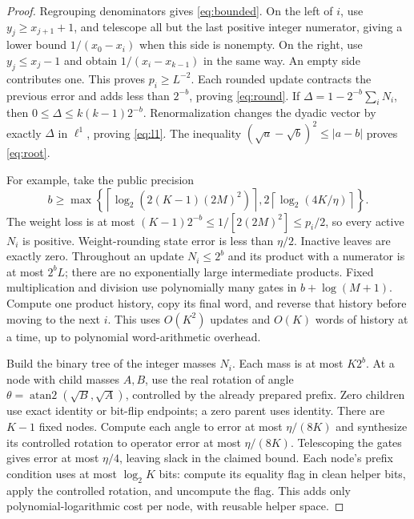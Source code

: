 \documentclass[11pt]{article}
\theoremstyle{definition}
\begin{document}
\begin{proof}
Regrouping denominators gives \eqref{eq:bounded}. On the left of $i$, use
$y_j\ge x_{j+1}+1$, and telescope all but the last positive integer
numerator, giving a lower bound $1/(x_0-x_i)$ when this side is nonempty.
On the right, use $y_j\le x_j-1$ and obtain $1/(x_i-x_{k-1})$ in the
same way. An empty side contributes one. This proves $p_i\ge L^{-2}$.
Each rounded update contracts the previous error and adds less than $2^{-b}$,
proving \eqref{eq:round}. If
$\Delta=1-2^{-b}\sum_iN_i$, then
$0\le\Delta\le k(k-1)2^{-b}$. Renormalization changes the dyadic vector
by exactly $\Delta$ in $\ell^1$, proving \eqref{eq:l1}.
The inequality $(\sqrt a-\sqrt b)^2\le|a-b|$ proves \eqref{eq:root}.

For example, take the public precision
\[
 b\ge\max\left\{\left\lceil\log_2(2(K-1)(2M)^2)\right\rceil,
             2\left\lceil\log_2(4K/\eta)\right\rceil\right\}.
\]
The weight loss is at most $(K-1)2^{-b}\le1/[2(2M)^2]\le p_i/2$,
so every active $N_i$ is positive. Weight-rounding state error is less
than $\eta/2$. Inactive leaves are exactly zero. Throughout an update
$N_i\le2^b$ and its product with a numerator is at most $2^bL$; there
are no exponentially large intermediate products. Fixed multiplication
and division use polynomially many gates in $b+\log(M+1)$. Compute one
product history, copy its final word, and reverse that history before
moving to the next $i$. This uses $O(K^2)$ updates and $O(K)$ words of
history at a time, up to polynomial word-arithmetic overhead.

Build the binary tree of the integer masses $N_i$. Each mass is at most
$K2^b$. At a node with child masses $A,B$, use the real rotation of angle
$\theta=\operatorname{atan2}(\sqrt B,\sqrt A)$, controlled by the already
prepared prefix. Zero children use exact identity or bit-flip endpoints;
a zero parent uses identity. There are $K-1$ fixed nodes. Compute each
angle to error at most $\eta/(8K)$ and synthesize its controlled rotation
to operator error at most $\eta/(8K)$. Telescoping the gates gives error
at most $\eta/4$, leaving slack in the claimed bound. Each node's prefix
condition uses at most $\log_2 K$ bits: compute its equality flag in clean
helper bits, apply the controlled rotation, and uncompute the flag. This
adds only polynomial-logarithmic cost per node, with reusable helper space.


\end{proof}
\end{document}
